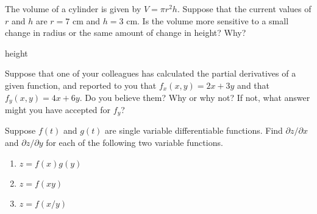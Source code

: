 \begin{enumialphparenastyle}
\begin{ex}
	The volume of a cylinder is given by $V=\pi r^2 h$.
	Suppose that the current values of $r$ and $h$ are $r=7$ cm and $h=3$ cm. Is
	the volume more sensitive to a small change in radius or the same amount of
	change in height? Why?
	\begin{sol}
		height
	\end{sol}
\end{ex}

\begin{ex}
Suppose that one of your colleagues has calculated the partial
  derivatives of a given function, and reported to you that
  $f_x(x,y)=2x+3y$ and that $f_y(x,y)=4x+6y$.  Do you believe them?
  Why or why not?  If not, what answer might you have accepted for
  $f_y$?
\end{ex}

\begin{ex}
Suppose $f(t)$ and $g(t)$ are single variable differentiable
  functions.  Find $\partial z/\partial x$ and
  $\partial z/\partial y$ for each of the following two variable functions.
\begin{enumerate}
	\item $z=f(x)g(y)$
	\item $z=f(xy)$
	\item $z=f(x/y)$
\end{enumerate}
\end{ex}

\end{enumialphparenastyle}
